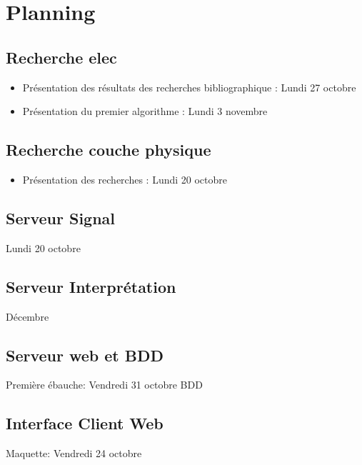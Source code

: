 \documentclass[10pt,a4paper]{article}
\begin{document}
\section{Planning}
\subsection{Recherche elec}
\begin{itemize}
	\item Présentation des résultats des recherches bibliographique : Lundi 27 octobre
	\item Présentation du premier algorithme : Lundi 3 novembre
\end{itemize}
\subsection{Recherche couche physique}
\begin{itemize}
	\item Présentation des recherches : Lundi 20 octobre
\end{itemize}
\subsection{Serveur Signal}
Lundi 20 octobre
\subsection{Serveur Interprétation}
Décembre
\subsection{Serveur web et BDD}
Première ébauche: Vendredi 31 octobre BDD 
\subsection{Interface Client Web}
Maquette: Vendredi 24 octobre 
\end{document}
